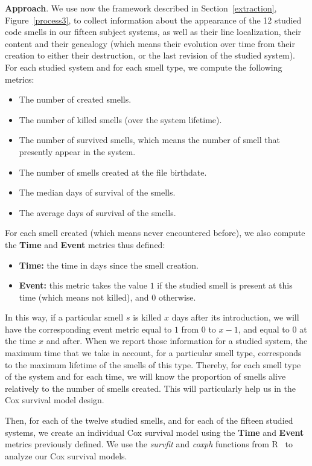 {\textbf{Approach}. We use now the framework described in Section~\ref{extraction}, Figure~\ref{process3}, to collect information about the appearance of the 12 studied code smells in our fifteen subject systems, as well as their line localization, their content and their genealogy (which means their evolution over time from their creation to either their destruction, or the last revision of the studied system).
For each studied system and for each smell type, we compute the following metrics:
\begin{itemize}
	\item The number of created smells.
	\item The number of killed smells (over the system lifetime).
	\item The number of survived smells, which means the number of smell that presently appear in the system.
	\item The number of smells created at the file birthdate.
	\item The median days of survival of the smells.
	\item The average days of survival of the smells.
\end{itemize}
For each smell created (which means never encountered before), we also compute the \textbf{Time} and \textbf{Event} metrics thus defined: 
\begin{itemize}
	\item \textbf{Time:} the time in days since the smell creation.
	\item \textbf{Event:} this metric takes the value $1$ if the studied smell is present at this time (which means not killed), and $0$ otherwise.
\end{itemize}
In this way, if a particular smell $s$ is killed $x$ days after its introduction, we will have the corresponding event metric equal to $1$ from $0$ to $x-1$, and equal to $0$ at the time $x$ and after. When we report those information for a studied system, the maximum time that we take in account, for a particular smell type, corresponds to the maximum lifetime of the smells of this type. Thereby, for each smell type of the system and for each time, we will know the proportion of smells alive relatively to the number of smells created. This will particularly help us in the Cox survival model design.

Then, for each of the twelve studied smells, and for each of the fifteen studied systems, we create an individual Cox survival model using the \textbf{Time} and \textbf{Event} metrics previously defined. We use the \textsl{survfit} and \textsl{coxph} functions from R~\cite{rPackage} to analyze our Cox survival models.

}

